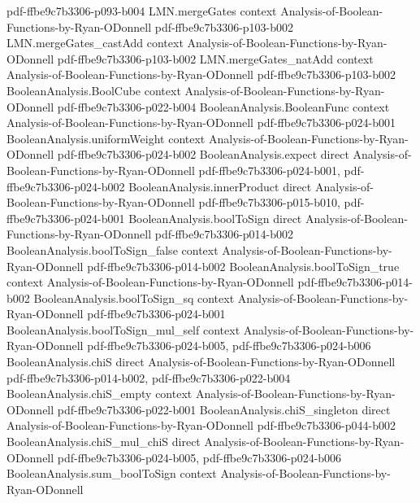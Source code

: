 \begin{lemma}
  {pdf-ffbe9c7b3306-p093-b004}
\proofstep
  {LMN.mergeGates}
  {context}
  {Analysis-of-Boolean-Functions-by-Ryan-ODonnell}
  {pdf-ffbe9c7b3306-p103-b002}
\proofstep
  {LMN.mergeGates_castAdd}
  {context}
  {Analysis-of-Boolean-Functions-by-Ryan-ODonnell}
  {pdf-ffbe9c7b3306-p103-b002}
\proofstep
  {LMN.mergeGates_natAdd}
  {context}
  {Analysis-of-Boolean-Functions-by-Ryan-ODonnell}
  {pdf-ffbe9c7b3306-p103-b002}
\proofstep
  {BooleanAnalysis.BoolCube}
  {context}
  {Analysis-of-Boolean-Functions-by-Ryan-ODonnell}
  {pdf-ffbe9c7b3306-p022-b004}
\proofstep
  {BooleanAnalysis.BooleanFunc}
  {context}
  {Analysis-of-Boolean-Functions-by-Ryan-ODonnell}
  {pdf-ffbe9c7b3306-p024-b001}
\proofstep
  {BooleanAnalysis.uniformWeight}
  {context}
  {Analysis-of-Boolean-Functions-by-Ryan-ODonnell}
  {pdf-ffbe9c7b3306-p024-b002}
\proofstep
  {BooleanAnalysis.expect}
  {direct}
  {Analysis-of-Boolean-Functions-by-Ryan-ODonnell}
  {pdf-ffbe9c7b3306-p024-b001,
    pdf-ffbe9c7b3306-p024-b002}
\proofstep
  {BooleanAnalysis.innerProduct}
  {direct}
  {Analysis-of-Boolean-Functions-by-Ryan-ODonnell}
  {pdf-ffbe9c7b3306-p015-b010,
    pdf-ffbe9c7b3306-p024-b001}
\proofstep
  {BooleanAnalysis.boolToSign}
  {direct}
  {Analysis-of-Boolean-Functions-by-Ryan-ODonnell}
  {pdf-ffbe9c7b3306-p014-b002}
\proofstep
  {BooleanAnalysis.boolToSign_false}
  {context}
  {Analysis-of-Boolean-Functions-by-Ryan-ODonnell}
  {pdf-ffbe9c7b3306-p014-b002}
\proofstep
  {BooleanAnalysis.boolToSign_true}
  {context}
  {Analysis-of-Boolean-Functions-by-Ryan-ODonnell}
  {pdf-ffbe9c7b3306-p014-b002}
\proofstep
  {BooleanAnalysis.boolToSign_sq}
  {context}
  {Analysis-of-Boolean-Functions-by-Ryan-ODonnell}
  {pdf-ffbe9c7b3306-p024-b001}
\proofstep
  {BooleanAnalysis.boolToSign_mul_self}
  {context}
  {Analysis-of-Boolean-Functions-by-Ryan-ODonnell}
  {pdf-ffbe9c7b3306-p024-b005,
    pdf-ffbe9c7b3306-p024-b006}
\proofstep
  {BooleanAnalysis.chiS}
  {direct}
  {Analysis-of-Boolean-Functions-by-Ryan-ODonnell}
  {pdf-ffbe9c7b3306-p014-b002,
    pdf-ffbe9c7b3306-p022-b004}
\proofstep
  {BooleanAnalysis.chiS_empty}
  {context}
  {Analysis-of-Boolean-Functions-by-Ryan-ODonnell}
  {pdf-ffbe9c7b3306-p022-b001}
\proofstep
  {BooleanAnalysis.chiS_singleton}
  {direct}
  {Analysis-of-Boolean-Functions-by-Ryan-ODonnell}
  {pdf-ffbe9c7b3306-p044-b002}
\proofstep
  {BooleanAnalysis.chiS_mul_chiS}
  {direct}
  {Analysis-of-Boolean-Functions-by-Ryan-ODonnell}
  {pdf-ffbe9c7b3306-p024-b005,
    pdf-ffbe9c7b3306-p024-b006}
\proofstep
  {BooleanAnalysis.sum_boolToSign}
  {context}
  {Analysis-of-Boolean-Functions-by-Ryan-ODonnell}

\end{lemma}
